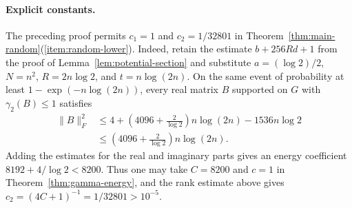\documentclass[11pt]{article}
\numberwithin{equation}{section}
\theoremstyle{definition}
\theoremstyle{remark}
\begin{document}
\paragraph{Explicit constants.}
The preceding proof permits $c_1=1$ and $c_2=1/32801$ in
Theorem~\ref{thm:main-random}(\ref{item:random-lower}). Indeed, retain
the estimate $b+256Rd+1$ from the proof of Lemma~\ref{lem:potential-section}
and substitute $a=(\log2)/2$, $N=n^2$, $R=2n\log2$, and
$t=n\log(2n)$. On the same event of probability at least
$1-\exp(-n\log(2n))$, every real matrix $B$ supported on $G$
with $\gamma_2(B)\leq1$ satisfies
\[
 \begin{aligned}
 \|B\|_F^2
 &\leq4+\left(4096+\frac2{\log2}\right)n\log(2n)
       -1536n\log2\\
 &\leq\left(4096+\frac2{\log2}\right)n\log(2n).
 \end{aligned}
\]
Adding the estimates for the real and imaginary parts gives an
energy coefficient $8192+4/\log2<8200$. Thus one may take
$C=8200$ and $c=1$ in Theorem~\ref{thm:gamma-energy}, and the
rank estimate above gives $c_2=(4C+1)^{-1}=1/32801>10^{-5}$.
\end{document}
